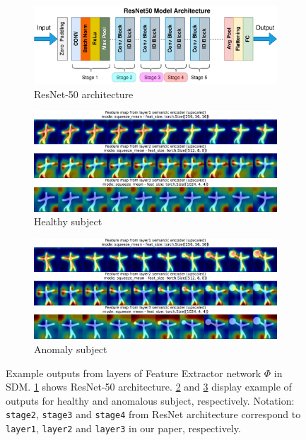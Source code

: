 \begin{figure}[htbp]
    \centering
    \begin{subfigure}{0.75\linewidth} 
        \includegraphics[width=\linewidth]{figures/resnet-50-arch.pdf}
        \caption{ResNet-50 architecture}  
        \label{fig:resnet50-arch}
    \end{subfigure}

    \begin{subfigure}{0.75\linewidth} 
        \includegraphics[width=\linewidth]{figures/fe-layer-healthy.pdf}
        \caption{Healthy subject}  
        \label{fig:fe-layer-healthy}
    \end{subfigure}

    \begin{subfigure}{0.75\linewidth} 
        \includegraphics[width=\linewidth]{figures/fe-layer-anomaly.pdf}
        \caption{Anomaly subject}  
        \label{fig:fe-layer-anomaly}
    \end{subfigure}
    \caption[Example feature maps from semantic encoder]{Example outputs from layers of Feature Extractor network $\Phi$ in \ac{SDM}. \cref{fig:resnet50-arch} shows ResNet-50 architecture. \cref{fig:fe-layer-healthy} and \cref{fig:fe-layer-anomaly} display example of outputs for healthy and anomalous subject, respectively. Notation: \texttt{stage2}, \texttt{stage3} and \texttt{stage4} from ResNet architecture correspond to \texttt{layer1}, \texttt{layer2} and \texttt{layer3} in our paper, respectively.}
    \label{fig:fe-layers}
\end{figure}

